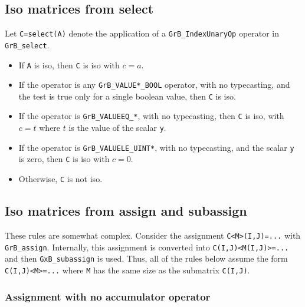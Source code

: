 \documentclass[12pt]{article}
\begin{document}
\subsection{Iso matrices from select}
\label{iso_select}

Let \verb'C=select(A)' denote the application of a \verb'GrB_IndexUnaryOp' operator
in \verb'GrB_select'.

    \begin{itemize}
    \item If \verb'A' is iso, then \verb'C' is iso with $c=a$.
    \item If the operator is any \verb'GrB_VALUE*_BOOL' operator,
        with no typecasting, and the test is true only for a single boolean
        value, then \verb'C' is iso.
    \item If the operator is \verb'GrB_VALUEEQ_*', with no typecasting,
        then \verb'C' is iso, with $c=t$ where $t$ is the value of the scalar
        \verb'y'.
    \item If the operator is \verb'GrB_VALUELE_UINT*', with no typecasting,
        and the scalar \verb'y' is zero, then \verb'C' is iso with $c=0$.
    \item Otherwise, \verb'C' is not iso.
    \end{itemize}

\subsection{Iso matrices from assign and subassign}
\label{iso_assign}

These rules are somewhat complex.  Consider the assignment \verb'C<M>(I,J)=...'
with \verb'GrB_assign'.  Internally, this assignment is converted into
\verb'C(I,J)<M(I,J)>=...' and then \verb'GxB_subassign' is used.  Thus,
all of the rules below assume the form \verb'C(I,J)<M>=...' where \verb'M'
has the same size as the submatrix \verb'C(I,J)'.

\subsubsection{Assignment with no accumulator operator}
\end{document}
